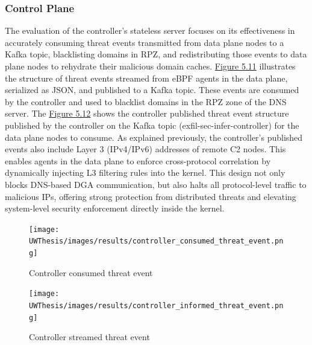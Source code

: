 \documentclass [11pt, proquest] {uwthesis}[2020/02/24]
\begin{document}
\subsubsection{Control Plane}
The evaluation of the controller’s stateless server focuses on its effectiveness in accurately consuming threat events transmitted from data plane nodes to a Kafka topic, blacklisting domains in RPZ, and redistributing those events to data plane nodes to rehydrate their malicious domain caches. \hyperref[fig:controller_metric]{Figure 5.11} illustrates the structure of threat events streamed from eBPF agents in the data plane, serialized as JSON, and published to a Kafka topic. These events are consumed by the controller and used to blacklist domains in the RPZ zone of the DNS server. The \hyperref[fig:controller_aware_metric]{Figure 5.12} shows the controller published threat event structure published by the controller on the Kafka topic (exfil-sec-infer-controller) for the data plane nodes to consume. As explained previously, the controller’s published events also include Layer 3 (IPv4/IPv6) addresses of remote C2 nodes. This enables agents in the data plane to enforce cross-protocol correlation by dynamically injecting L3 filtering rules into the kernel. This design not only blocks DNS-based DGA communication, but also halts all protocol-level traffic to malicious IPs, offering strong protection from distributed threats and elevating system-level security enforcement directly inside the kernel.


\begin{figure}[H]
  \centering
  \begin{minipage}[t]{0.47\textwidth}
    \centering
    \texttt{[image: UWThesis/images/results/controller\_consumed\_threat\_event.png]}
\caption{Controller consumed threat event}
  \label{fig:controller_metric}
  \end{minipage}
  \hfill
  \begin{minipage}[t]{0.47\textwidth}
    \centering
    \texttt{[image: UWThesis/images/results/controller\_informed\_threat\_event.png]}
    \caption{Controller streamed threat event}
     \label{fig:controller_aware_metric}
  \end{minipage}
\end{figure}
\end{document}
